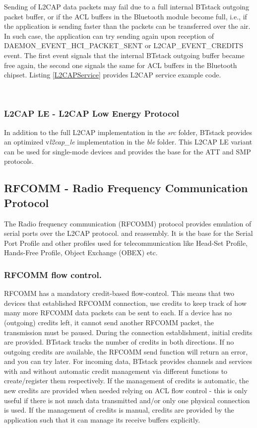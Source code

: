 Sending of L2CAP data packets may fail due to a full internal BTstack outgoing packet buffer, or if the ACL buffers in the Bluetooth module become full, i.e., if the application is sending faster than the packets can be transferred over the air. In such case, the application can try sending again upon reception of DAEMON\_EVENT\_HCI\_PACKET\_SENT or L2CAP\_EVENT\_CREDITS event. The first event signals that the internal BTstack outgoing buffer became free again, the second one signals the same for ACL buffers in the Bluetooth chipset. Listing \ref{L2CAPService} provides L2CAP service example code.

 \\

\subsubsection{L2CAP LE - L2CAP Low Energy Protocol}
In addition to the full L2CAP implementation in the \emph{src} folder, BTstack provides an optimized v\emph{l2cap\_le} implementation in the \emph{ble} folder. This L2CAP LE variant can be used for single-mode devices and provides the base for the ATT and SMP protocols.



\subsection{RFCOMM - Radio Frequency Communication Protocol}
The Radio frequency communication (RFCOMM) protocol provides emulation of serial ports over the L2CAP protocol.
and reassembly. It is the base for the Serial Port Profile and other profiles used for telecommunication like Head-Set Profile, Hands-Free Profile, Object Exchange (OBEX) etc.

\subsubsection{RFCOMM flow control.}
RFCOMM has a mandatory credit-based flow-control. This means that two devices that established RFCOMM connection, use credits to keep track of how many more RFCOMM data packets can be sent to each. If a device has no (outgoing) credits left, it cannot send another RFCOMM packet, the transmission must be paused. During the connection establishment, initial credits are provided. BTstack tracks the number of credits in both directions. If no outgoing credits are available, the RFCOMM send function will return an error, and you can try later. For incoming data, BTstack provides channels and services with and without automatic credit management via different functions to create/register them respectively. If the management of credits is automatic, the new credits are provided when needed relying on ACL flow control - this is only useful if there is not much data transmitted and/or only one physical connection is used. If the management of credits is manual, credits are provided by the application such that it can manage its receive buffers explicitly. 

